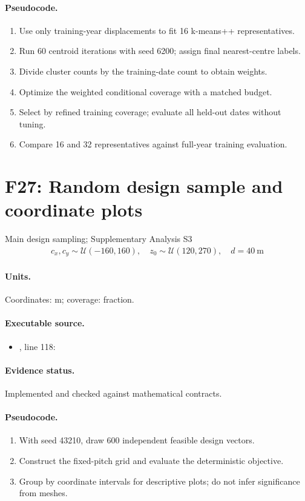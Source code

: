 \documentclass[10pt]{article}
\begin{document}
\paragraph{Pseudocode.}
\begin{enumerate}[leftmargin=*]
\item Use only training-year displacements to fit 16 k-means++ representatives.
\item Run 60 centroid iterations with seed 6200; assign final nearest-centre labels.
\item Divide cluster counts by the training-date count to obtain weights.
\item Optimize the weighted conditional coverage with a matched budget.
\item Select by refined training coverage; evaluate all held-out dates without tuning.
\item Compare 16 and 32 representatives against full-year training evaluation.
\end{enumerate}
\newpage
\section*{F27: Random design sample and coordinate plots}
Main design sampling; Supplementary Analysis S3
\begin{gather*}c_x,c_y\sim\mathcal U(-160,160),\quad z_0\sim\mathcal U(120,270),\quad d=40\ \mathrm m\end{gather*}
\paragraph{Units.} Coordinates: m; coverage: fraction.
\paragraph{Executable source.}
\begin{itemize}[leftmargin=*]
\item {}, line 118: 
\end{itemize}
\paragraph{Evidence status.} Implemented and checked against mathematical contracts.
\paragraph{Pseudocode.}
\begin{enumerate}[leftmargin=*]
\item With seed 43210, draw 600 independent feasible design vectors.
\item Construct the fixed-pitch grid and evaluate the deterministic objective.
\item Group by coordinate intervals for descriptive plots; do not infer significance from meshes.
\end{enumerate}
\end{document}
